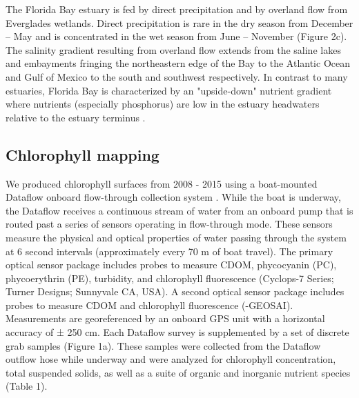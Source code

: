 The Florida Bay estuary is fed by direct precipitation and by overland flow from Everglades wetlands. Direct precipitation is rare in the dry season from December – May and is concentrated in the wet season from June – November (Figure 2c). The salinity gradient resulting from overland flow extends from the saline lakes and embayments fringing the northeastern edge of the Bay to the Atlantic Ocean and Gulf of Mexico to the south and southwest respectively. In contrast to many estuaries, Florida Bay is characterized by an "upside-down" nutrient gradient where nutrients (especially phosphorus) are low in the estuary headwaters relative to the estuary terminus \citep{childers_relating_2006}.

\subsection{Chlorophyll mapping}
\label{chlmapping}

We produced chlorophyll surfaces from 2008 - 2015 using a boat-mounted Dataflow onboard flow-through collection system \citep{madden1992instrument}. While the boat is underway, the Dataflow receives a continuous stream of water from an onboard pump that is routed past a series of sensors operating in flow-through mode. These sensors measure the physical and optical properties of water passing through the system at 6 second intervals (approximately every 70 m of boat travel). The primary optical sensor package includes probes to measure CDOM, phycocyanin (PC), phycoerythrin (PE), turbidity, and chlorophyll fluorescence (Cyclops-7 Series; Turner Designs; Sunnyvale CA, USA). A second optical sensor package includes probes to measure CDOM and chlorophyll fluorescence (-GEOSAI). Measurements are georeferenced by an onboard GPS unit with a horizontal accuracy of ± 250 cm. Each Dataflow survey is supplemented by a set of discrete grab samples (Figure 1a). These samples were collected from the Dataflow outflow hose while underway and were analyzed for chlorophyll concentration, total suspended solids, as well as a suite of organic and inorganic nutrient species (Table 1).

